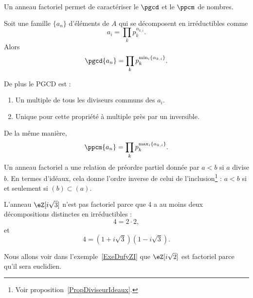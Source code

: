 Un anneau factoriel permet de caractériser le \( \pgcd\) et le \( \ppcm\) de nombres.

\begin{proposition}
	Soit une famille \( \{ a_n \}\) d'éléments de \( A\) qui se décomposent en irréductibles comme
	\begin{equation}
		a_i=\prod_k p_k^{\alpha_{k,i}}.
	\end{equation}
	Alors
	\begin{equation}
		\pgcd\{ a_n \}=\prod_k p_k^{\min_i\{ \alpha_{k,i} \}}.
	\end{equation}

	De plus le PGCD est :
	\begin{enumerate}
		\item
		      Un multiple de tous les diviseurs communs des \( a_i\).
		\item
		      Unique pour cette propriété à multiple près par un inversible.
	\end{enumerate}
\end{proposition}

De la même manière,
\begin{equation}
	\ppcm\{ a_n \}=\prod_kp_k^{\max_i\{ \alpha_{k,i} \}}.
\end{equation}
Un anneau factoriel a une relation de préordre partiel donnée par \( a<b\) si \( a\) divise \( b\). En termes d'idéaux, cela donne l'ordre inverse de celui de l'inclusion\footnote{Voir proposition~\ref{PropDiviseurIdeaux}.} : \( a<b\) si et seulement si \( (b)\subset (a)\).

\begin{example} \label{EXooCWJUooCDJqkr}
	L'anneau \( \eZ[i\sqrt{3}]\) n'est pas factoriel parce que \( 4\) a au moins deux décompositions distinctes en irréductibles :
	\begin{equation}
		4=2\cdot 2,
	\end{equation}
	et
	\begin{equation}
		4=(1+i\sqrt{3})(1-i\sqrt{3}).
	\end{equation}
\end{example}

Nous allons voir dans l'exemple~\ref{ExeDufyZI} que \( \eZ[i\sqrt{2}]\) est factoriel parce qu'il sera euclidien.

